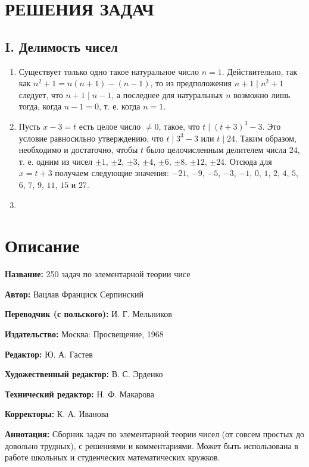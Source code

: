 \documentclass[12pt, a4paper, openany]{book}
\begin{document}
\newpage

\section[Решения задач]{\center РЕШЕНИЯ ЗАДАЧ}
\subsection[I. Делимость чисел]{\center I. Делимость чисел}

\begin{enumerate}
	\item Существует только одно такое натуральное число $n=1$. Действительно, так как $n^2+1=n(n+1)-(n-1)$, то из предположения $n+1 \mid n^2+1$ следует, что $n+1 \mid n-1$, а последнее для натуральных $n$ возможно лишь тогда, когда $n-1=0$, т. е. когда $n=1$.
	\item Пусть $x-3=t$ есть целое число $\neq0$, такое, что $t \mid (t+3)^3-3$. Это условие равносильно утверждению, что $t \mid 3^3-3$ или $t \mid 24$. Таким образом, необходимо и достаточно, чтобы $t$ было целочисленным делителем числа $24$, т. е. одним из чисел $\pm1$, $\pm2$, $\pm3$, $\pm4$, $\pm6$, $\pm8$, $\pm12$, $\pm24$. Отсюда для $x=t+3$ получаем следующие значения: $-21$, $-9$, $-5$, $-3$, $-1$, $0$, $1$, $2$, $4$, $5$, $6$, $7$, $9$, $11$, $15$ и $27$.
	\item
	
\end{enumerate}


	\newpage
	\tableofcontents
	
	\thispagestyle{empty} %
	
	\newpage
	
	\setcounter{secnumdepth}{0}  
	
	
		\section*{Описание}
	
	{\bf Название:} 250 задач по элементарной теории чисе
	
{\bf Автор:} Вацлав Франциск Серпинский

{\bf Переводчик (с польского):} И. Г. Мельников
	
{\bf Издательство:} Москва: Просвещение, 1968
	
		{\bf Редактор:} Ю. А. Гастев
	
		{\bf Художественный редактор:} В. С. Эрденко
	
		{\bf Технический редактор:} Н. Ф. Макарова
	
		{\bf Корректоры:} К. А. Иванова
	
		{\bf Аннотация:} Сборник задач по элементарной теории чисел (от совсем простых до довольно трудных), с решениями и комментариями. Может быть использована в работе школьных и студенческих математических кружков.
		\thispagestyle{empty} %

	
\end{document}
